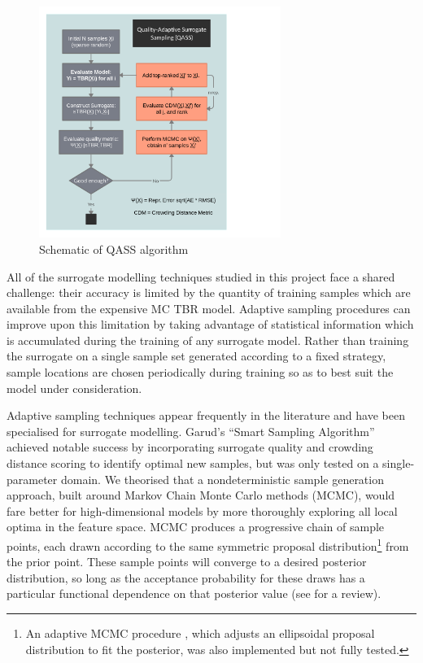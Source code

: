 \begin{figure}
	\centering
	\vspace{-3ex}
	\includegraphics[width=0.7\textwidth]{fig4_qassplan.png}
	\caption{Schematic of QASS algorithm}
	\label{fig:qassplan}
\end{figure}

All of the surrogate modelling techniques studied in this project face a shared
challenge: their accuracy is limited by the quantity of training samples which
are available from the expensive MC TBR model. Adaptive sampling procedures can
improve upon this limitation by taking advantage of statistical information
which is accumulated during the training of any surrogate model. Rather than
training the surrogate on a single sample set generated according to a fixed
strategy, sample locations are chosen periodically during training so as to best suit the model
under consideration.

Adaptive sampling techniques appear frequently in the literature and have been
specialised for surrogate modelling. Garud's \cite{Garud2016} ``Smart Sampling
Algorithm'' achieved notable success by incorporating surrogate quality and
crowding distance scoring to identify optimal new samples, but was only tested
on a single-parameter domain. We theorised that a nondeterministic sample
generation approach, built around Markov Chain Monte Carlo methods (MCMC), would
fare better for high-dimensional models by more thoroughly exploring all local
optima in the feature space. MCMC produces a progressive chain of sample points,
each drawn according to the same symmetric proposal distribution\footnote{An
adaptive MCMC procedure \cite{Zhang2012}, which adjusts an ellipsoidal proposal
distribution to fit the posterior, was also implemented but not fully tested.}
from the prior point. These sample points will converge to a desired posterior
distribution, so long as the acceptance probability for these draws has a
particular functional dependence on that posterior value (see \cite{Zhou2018}
for a review).


